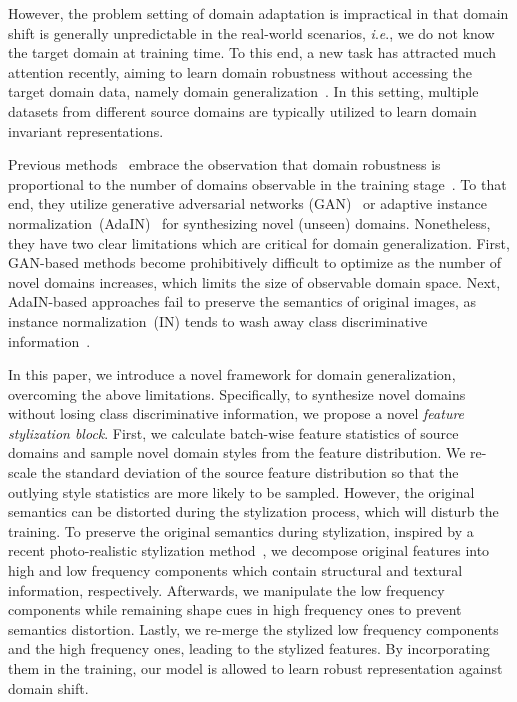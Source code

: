 \documentclass[sigconf]{acmart}
\newcommand{\ie}{\textit{i}.\textit{e}.}
\begin{document}
However, the problem setting of domain adaptation is impractical in that domain shift is generally unpredictable in the real-world scenarios, \ie, we do not know the target domain at training time.
To this end, a new task has attracted much attention recently, aiming to learn domain robustness without accessing the target domain data, namely domain generalization~\cite{carlucci2019domain, Li2018LearningTG, Li2019EpisodicTF, dou2019domain, li2018domain, ghifary2015domain, Seo2020LearningTO, Chattopadhyay2020LearningTB, huang2021fsdr, qiao2021uncertainty, choi2021robustnet, xu2021fourier}.
In this setting, multiple datasets from different source domains are typically utilized to learn domain invariant representations. 

Previous methods~\cite{zhou2020learning, nuriel2020permuted, xu2020robust, qiao2020learning} embrace the observation that domain robustness is proportional to the number of domains observable in the training stage~\cite{tobin2017domain}.
To that end, they utilize generative adversarial networks (GAN)~\cite{zhou2020learning} or adaptive instance normalization~(AdaIN)~\cite{huang2017arbitrary, nuriel2020permuted} for synthesizing novel (unseen) domains.
Nonetheless, they have two clear limitations which are critical for domain generalization.
First, GAN-based methods become prohibitively difficult to optimize as the number of novel domains increases, which limits the size of observable domain space.
Next, AdaIN-based approaches fail to preserve the semantics of original images, as instance normalization~(IN) tends to wash away class discriminative information~\cite{nam2018batch, Seo2020LearningTO}.

In this paper, we introduce a novel framework for domain generalization, overcoming the above limitations.
Specifically, to synthesize novel domains without losing class discriminative information, we propose a novel \textit{feature stylization block}.
First, we calculate batch-wise feature statistics of source domains and sample novel domain styles from the feature distribution.
We re-scale the standard deviation of the source feature distribution so that the outlying style statistics are more likely to be sampled.
However, the original semantics can be distorted during the stylization process, which will disturb the training. 
To preserve the original semantics during stylization, inspired by a recent photo-realistic stylization method~\cite{Yoo2019PhotorealisticST}, we decompose original features into high and low frequency components which contain structural and textural information, respectively.
Afterwards, we manipulate the low frequency components while remaining shape cues in high frequency ones to prevent semantics distortion.
Lastly, we re-merge the stylized low frequency components and the high frequency ones, leading to the stylized features.
By incorporating them in the training, our model is allowed to learn robust representation against domain shift.
\end{document}
